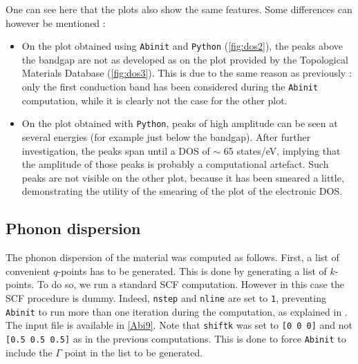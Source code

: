 \documentclass[11pt,a4paper]{article}
\begin{document}
One can see here that the plots also show the same features. Some differences can however be mentioned : 
\begin{itemize}
\item On the plot obtained using \texttt{Abinit} and \texttt{Python} (\autoref{fig:dos2}), the peaks above the bandgap are not as developed as on the plot provided by the Topological Materials Database (\autoref{fig:dos3}). This is due to the same reason as previously : only the first conduction band has been considered during the \texttt{Abinit} computation, while it is clearly not the case for the other plot. 
\item On the plot obtained with \texttt{Python}, peaks of high amplitude can be seen at several energies (for example just below the bandgap). After further investigation, the peaks span until a DOS of $\sim$ 65 states/eV, implying that the amplitude of those peaks is probably a computational artefact. Such peaks are not visible on the other plot, because it has been smeared a little, demonstrating the utility of the smearing of the plot of the electronic DOS.
\end{itemize}

\subsection{Phonon dispersion}
The phonon dispersion of the material was computed as follows. First, a list of convenient $q$-points has to be generated. This is done by generating a list of $k$-points. To do so, we run a standard SCF computation. However in this case the SCF procedure is dummy. Indeed, \texttt{nstep} and \texttt{nline} are set to \texttt{1}, preventing \texttt{Abinit} to run more than one iteration during the computation, as explained in \cite{tutoPhonons}. The input file is available in \autoref{Abi9}. Note that \texttt{shiftk} was set to \texttt{[0 0 0]} and not \texttt{[0.5 0.5 0.5]} as in the previous computations. This is done to force \texttt{Abinit} to include the $\Gamma$ point in the list to be generated.
\end{document}
